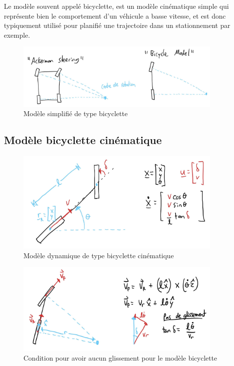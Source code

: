 Le modèle souvent appelé bicyclette, est un modèle cinématique simple qui représente bien le comportement d'un véhicule a basse vitesse, et est donc typiquement utilisé pour planifié une trajectoire dans un stationnement par exemple.
\begin{figure}[htbp]
	\centering
		\includegraphics[width=0.90\textwidth]{fig/ackerman.jpg}
	\caption{Modèle simplifié de type bicyclette}
	\label{fig:ackerman}
\end{figure}

\subsection{Modèle bicyclette cinématique}

\begin{figure}[htbp]
	\centering
		\includegraphics[width=0.90\textwidth]{fig/bicyclemodel.jpg}
	\caption{Modèle dynamique de type bicyclette cinématique}
	\label{fig:bicyclemodel}
\end{figure}

\begin{figure}[htbp]
	\centering
		\includegraphics[width=0.90\textwidth]{fig/bicyclemodel2.jpg}
	\caption{Condition pour avoir aucun glissement pour le modèle bicyclette}
	\label{fig:bicyclemodel2}
\end{figure}

